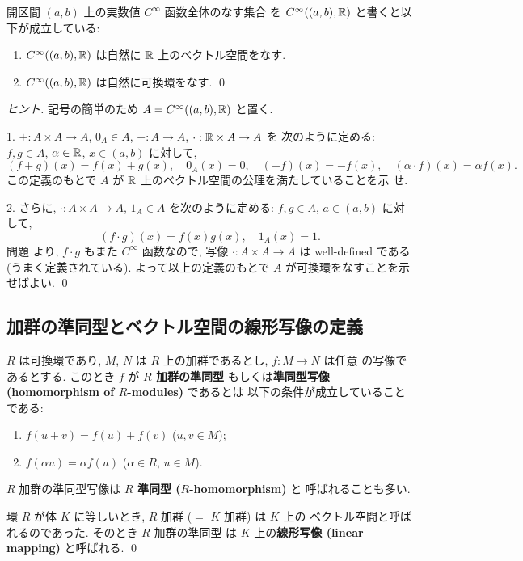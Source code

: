 \documentclass[12pt,twoside]{jarticle}
\begin{document}
\begin{question}
  \label{q:Cinfty}
  開区間 $(a,b)$ 上の実数値 $C^\infty$ 函数全体のなす集合
  を $C^\infty((a,b),{\mathbb R})$ と書くと以下が成立している:
  \begin{enumerate}
  \item $C^\infty((a,b),{\mathbb R})$ は自然に ${\mathbb R}$ 上のベクトル空間をなす.
  \item $C^\infty((a,b),{\mathbb R})$ は自然に可換環をなす.
    \qed
  \end{enumerate}
\end{question}

\begin{proof}[ヒント]
  記号の簡単のため $A=C^\infty((a,b),{\mathbb R})$ と置く.
  
  1. $+:A\times A\to A$, $0_A\in A$, $-:A\to A$, $\cdot:{\mathbb R}\times A\to A$ を
  次のように定める: $f,g\in A$, $\alpha\in{\mathbb R}$, $x\in (a,b)$ に対して,
  \begin{equation*}
    (f+g)(x)=f(x)+g(x), \quad
    0_A(x) = 0, \quad
    (-f)(x) = -f(x), \quad
    (\alpha\cdot f)(x) = \alpha f(x).
  \end{equation*}
  この定義のもとで $A$ が ${\mathbb R}$ 上のベクトル空間の公理を満たしていることを示
  せ.

  2. さらに, $\cdot:A\times A\to A$, $1_A\in A$ を次のように定める:
  $f,g\in A$, $a\in (a,b)$ に対して,
  \begin{equation*}
    (f\cdot g)(x) = f(x)g(x), \quad
    1_A(x) = 1.
  \end{equation*}
  問題  より, $f\cdot g$ もまた $C^\infty$ 函数なので,
  写像 $\cdot:A\times A\to A$ は well-defined である(うまく定義されている).
  よって以上の定義のもとで $A$ が可換環をなすことを示せばよい.
  \qed
\end{proof}


\subsection{加群の準同型とベクトル空間の線形写像の定義}
\label{sec:def-hom}

\begin{definition}[加群の準同型とベクトル空間の線形写像]
  $R$ は可換環であり, $M$, $N$ は $R$ 上の加群であるとし, $f:M\to N$ は任意
  の写像であるとする.  
  このとき $f$ が {\bf $R$ 加群の準同型}
  もしくは{\bf 準同型写像 (homomorphism of $R$-modules)} であるとは
  以下の条件が成立していることである:
  \begin{enumerate}
  \item $f(u+v) = f(u) + f(v)$ \quad ($u,v\in M$);
  \item $f(\alpha u) = \alpha f(u)$ \quad ($\alpha\in R$, $u\in M$).
  \end{enumerate}
  $R$ 加群の準同型写像は {\bf $R$ 準同型 ($R$-homomorphism)} と
  呼ばれることも多い.

  環 $R$ が体 $K$ に等しいとき, $R$ 加群 ($=$ $K$ 加群) は $K$ 上の
  ベクトル空間と呼ばれるのであった. そのとき $R$ 加群の準同型
  は $K$ 上の{\bf 線形写像 (linear mapping)} と呼ばれる.
  \qed
\end{definition}
\end{document}

